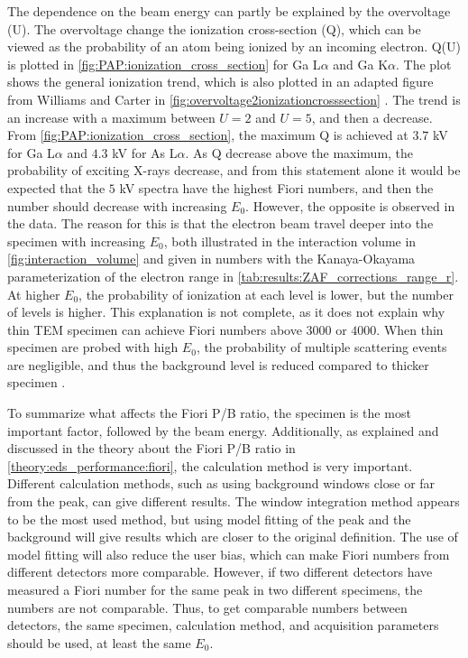 The dependence on the beam energy can partly be explained by the overvoltage (U).
The overvoltage change the ionization cross-section (Q), which can be viewed as the probability of an atom being ionized by an incoming electron.
Q(U) is plotted in \cref{fig:PAP:ionization_cross_section} for Ga L$\alpha$ and Ga K$\alpha$.
The plot shows the general ionization trend, which is also plotted in an adapted figure from Williams and Carter in \cref{fig:overvoltage2ionizationcrosssection} \cite{williams_carter_tem_2009}.
The trend is an increase with a maximum between $U=2$ and $U=5$, and then a decrease.
From \cref{fig:PAP:ionization_cross_section}, the maximum Q is achieved at $3.7$ kV for Ga L$\alpha$ and $4.3$ kV for As L$\alpha$.
As Q decrease above the maximum, the probability of exciting X-rays decrease, and from this statement alone it would be expected that the $5$ kV spectra have the highest Fiori numbers, and then the number should decrease with increasing $E_0$.
However, the opposite is observed in the data.
The reason for this is that the electron beam travel deeper into the specimen with increasing $E_0$, both illustrated in the interaction volume in \cref{fig:interaction_volume} and given in numbers with the Kanaya-Okayama parameterization of the electron range in \cref{tab:results:ZAF_corrections_range_r}.
At higher $E_0$, the probability of ionization at each level is lower, but the number of levels is higher.
This explanation is not complete, as it does not explain why thin TEM specimen can achieve Fiori numbers above $3000$ or $4000$.
When thin specimen are probed with high $E_0$, the probability of multiple scattering events are negligible, and thus the background level is reduced compared to thicker specimen \cite{liao2006practical}.


To summarize what affects the Fiori P/B ratio, the specimen is the most important factor, followed by the beam energy.
Additionally, as explained and discussed in the theory about the Fiori P/B ratio in \cref{theory:eds_performance:fiori}, the calculation method is very important.
Different calculation methods, such as using background windows close or far from the peak, can give different results.
The window integration method appears to be the most used method, but using model fitting of the peak and the background will give results which are closer to the original definition.
The use of model fitting will also reduce the user bias, which can make Fiori numbers from different detectors more comparable.
However, if two different detectors have measured a Fiori number for the same peak in two different specimens, the numbers are not comparable.
Thus, to get comparable numbers between detectors, the same specimen, calculation method, and acquisition parameters should be used, at least the same $E_0$.



